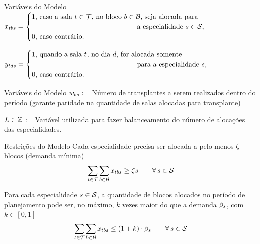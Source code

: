 \documentclass[10pt]{beamer}
\begin{document}
\begin{frame}{Variáveis do Modelo}
    $\blockvar = \begin{cases}
        1\text{, caso a sala $\roomidx \in \roomset$, no bloco $\blockidx \in \blockset$, seja alocada para} \\
        \hspace{15em}\text{a especialidade $\specialtyidx \in \specialtyset$,} \\
        0\text{, caso contrário.}
    \end{cases}$
    \vspace{2em}

    $\precvar = \begin{cases}
        1\text{, quando a sala $\roomidx$, no dia $\planninghorizonidx$, for alocada somente} \\
        \hspace{15em}\text{para a especialidade $\specialtyidx$,} \\
        0\text{, caso contrário.}
    \end{cases}$
\end{frame}


\begin{frame}{Variáveis do Modelo}
    $w_{bs} := $ Número de transplantes a serem realizados dentro do período (garante paridade na quantidade de salas alocadas para transplante)
    \vspace{2em}

    $L \in \mathbb{Z}$ := Variável utilizada para fazer balanceamento do número de alocações das especialidades. 
\end{frame}


\begin{frame}{Restrições do Modelo}
    Cada especialidade precisa ser alocada a pelo menos $\zeta$ blocos (demanda mínima)
    \begin{equation}
    \label{eq:m2-2}
        \sum_{t \in \mathcal{T}} \sum_{b \in \mathcal{B}} x_{tbs} \geq \zeta{s} \hspace{2em} \forall\, s \in \mathcal{S}
    \end{equation}
    \vspace{2em}

    Para cada especialidade $s \in \mathcal{S}$, a quantidade de blocos alocados no período de planejamento pode ser, no máximo, $k$ vezes maior do que a demanda $\beta_{s}$, com $k \in [0,1]$
    \begin{equation}
    \label{eq:m2-3}
        \sum_{t \in \mathcal{T}} \sum_{b \in \mathcal{B}} x_{tbs} \leq (1 + k) \cdot \beta_{s} \hspace{2em} \forall\, s \in \mathcal{S}
    \end{equation}
\end{frame}
\end{document}
